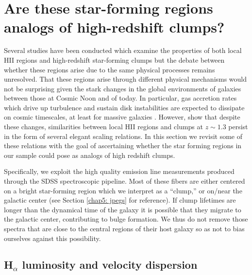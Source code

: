 


\section{Are these star-forming regions analogs of high-redshift clumps?}
\label{chap5: clump properties}

Several studies have been conducted which examine the properties of both local HII regions and high-redshift star-forming clumps \citep[e.g.,][]{Monreal-Ibero2007,Swinbank2009,Wisnioski2012} but the debate between whether these regions arise due to the same physical processes remains unresolved. That these regions arise through different physical mechanisms would not be surprising given the stark changes in the global environments of galaxies between those at Cosmic Noon and of today. In particular, gas accretion rates which drive up turbulence and sustain disk instabilities are expected to dissipate on cosmic timescales, at least for massive galaxies \citep{Dekel2006}. However, \cite{Wisnioski2012} show that despite these changes, similarities between local HII regions and clumps at $z\sim1.3$ persist in the form of several elegant scaling relations. In this section we revisit some of these relations with the goal of ascertaining whether the star forming regions in our sample could pose as analogs of high redshift clumps. 

Specifically, we exploit the high quality emission line measurements produced through the SDSS spectroscopic pipeline. Most of these fibers are either centered on a bright star-forming region which we interpret as a ``clump,'' or on/near the galactic center (see Section \ref{chap5: jpegs} for reference). If clump lifetimes are longer than the dynamical time of the galaxy it is possible that they migrate to the galactic center, contributing to bulge formation. We thus do not remove those spectra that are close to the central regions of their host galaxy so as not to bias ourselves against this possibility. 

\subsection{H$_{\alpha}$ luminosity and velocity dispersion}
\label{chap5: luminosity}

